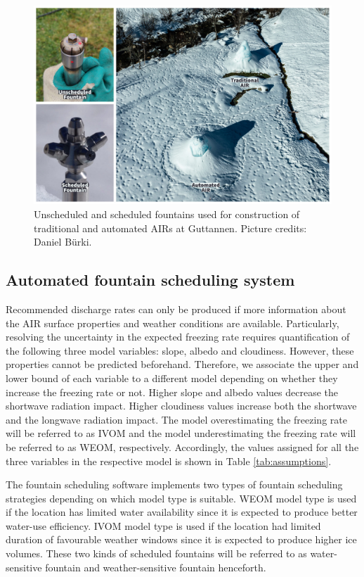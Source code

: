 \begin{figure}[htb]
	\includegraphics[width=\textwidth]{figs/AIR_fountains.jpg}
	\caption{Unscheduled and scheduled fountains used for construction of traditional and automated AIRs at
		Guttannen. Picture credits: Daniel Bürki.}
	\label{fig:autovsman}
\end{figure}

\subsection{Automated fountain scheduling system}

Recommended discharge rates can only be produced if more information about the AIR surface properties and
weather conditions are available. Particularly, resolving the uncertainty in the expected freezing rate requires
quantification of the following three model variables: slope, albedo and cloudiness. However, these properties
cannot be predicted beforehand. Therefore, we associate the upper and lower bound of each variable to a
different model depending on whether they increase the freezing rate or not. Higher slope and albedo values
decrease the shortwave radiation impact. Higher cloudiness values increase both the shortwave and the longwave
radiation impact. The model overestimating the freezing rate will be referred to as \ac{IVOM} and the model
underestimating the freezing rate will be referred to as  \ac{WEOM}, respectively. Accordingly, the values
assigned for all the three variables in the respective model is shown in Table \ref{tab:assumptions}.

The fountain scheduling software implements two types of fountain scheduling strategies depending on which
model type is suitable. WEOM model type is used if the location has limited water availability since it is expected to
produce better water-use efficiency. \ac{IVOM} model type is used if the location had limited duration of favourable
weather windows since it is expected to produce higher ice volumes. These two kinds of scheduled fountains will
be referred to as water-sensitive fountain and weather-sensitive fountain henceforth.

